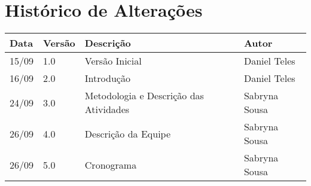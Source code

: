 \chapter*{Histórico de Alterações}

\begin{table}[!htbp]
\centering
\label{my-label}
\begin{tabular}{|l|l|l|l|}
\hline
\textbf{Data} & \textbf{Versão} & \textbf{Descrição} & \textbf{Autor} \\ \hline
15/09         & 1.0             & Versão Inicial     & Daniel Teles   \\ \hline
16/09         & 2.0             & Introdução         & Daniel Teles   \\ \hline
24/09         & 3.0             & Metodologia e Descrição das Atividades       & Sabryna Sousa  \\ \hline
26/09         & 4.0             & Descrição da Equipe       & Sabryna Sousa  \\ \hline
26/09         & 5.0             & Cronograma       & Sabryna Sousa  \\ \hline

\end{tabular}
\end{table}

\cleardoublepage

